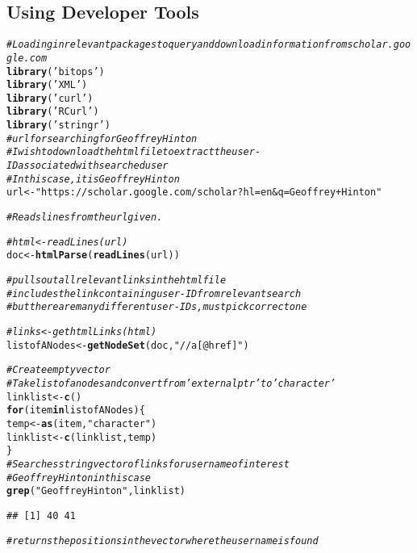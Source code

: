 \documentclass{article}\usepackage[]{graphicx}\usepackage[]{color}
\makeatletter
\newcommand{\hlstr}[1]{\textcolor[rgb]{0.192,0.494,0.8}{#1}}%
\newcommand{\hlcom}[1]{\textcolor[rgb]{0.678,0.584,0.686}{\textit{#1}}}%
\newcommand{\hlstd}[1]{\textcolor[rgb]{0.345,0.345,0.345}{#1}}%
\newcommand{\hlkwa}[1]{\textcolor[rgb]{0.161,0.373,0.58}{\textbf{#1}}}%
\newcommand{\hlkwb}[1]{\textcolor[rgb]{0.69,0.353,0.396}{#1}}%
\newcommand{\hlkwd}[1]{\textcolor[rgb]{0.737,0.353,0.396}{\textbf{#1}}}%
\newenvironment{kframe}{%
 \def\at@end@of@kframe{}%
 \ifinner\ifhmode%
  \def\at@end@of@kframe{\end{minipage}}%
  \begin{minipage}{\columnwidth}%
 \fi\fi%
 \def\FrameCommand##1{\hskip\@totalleftmargin \hskip-\fboxsep
 \colorbox{shadecolor}{##1}\hskip-\fboxsep
     \hskip-\linewidth \hskip-\@totalleftmargin \hskip\columnwidth}%
 \MakeFramed {\advance\hsize-\width
   \@totalleftmargin\z@ \linewidth\hsize
   \@setminipage}}%
 {\par\unskip\endMakeFramed%
 \at@end@of@kframe}
\newenvironment{knitrout}{}{} %
\makeatother
\begin{document}
\subsection{Using Developer Tools}
\begin{knitrout}
\color{fgcolor}\begin{kframe}
\begin{alltt}
\hlcom{#Loading in relevant packages to query and download information from scholar.google.com}
\hlkwd{library}\hlstd{(}\hlstr{'bitops'}\hlstd{)}
\hlkwd{library}\hlstd{(}\hlstr{'XML'}\hlstd{)}
\hlkwd{library}\hlstd{(}\hlstr{'curl'}\hlstd{)}
\hlkwd{library}\hlstd{(}\hlstr{'RCurl'}\hlstd{)}
\hlkwd{library}\hlstd{(}\hlstr{'stringr'}\hlstd{)}
\hlcom{#url for searching for Geoffrey Hinton}
\hlcom{#I wish to download the html file to extract the user-ID associated with searched user}
\hlcom{#In this case, it is Geoffrey Hinton}
\hlstd{url}\hlkwb{<-}\hlstr{"https://scholar.google.com/scholar?hl=en&q=Geoffrey+Hinton"}

\hlcom{#Reads lines from the url given.}

\hlcom{#html<-readLines(url)}
\hlstd{doc}\hlkwb{<-}\hlkwd{htmlParse}\hlstd{(}\hlkwd{readLines}\hlstd{(url))}
\end{alltt}


{\ttfamily\noindent\color{warningcolor}{\#\# Warning in readLines(url): incomplete final line found on 'https://scholar.google.com/scholar?hl=en\&q=Geoffrey+Hinton'}}\begin{alltt}
\hlcom{#pulls out all relevant links in the html file}
\hlcom{#includes the link containing user-ID from relevant search}
\hlcom{#but there are many different user-IDs, must pick correct one}

\hlcom{#links<-gethtmlLinks(html)}
\hlstd{listofANodes}\hlkwb{<-}\hlkwd{getNodeSet}\hlstd{(doc,} \hlstr{"//a[@href]"}\hlstd{)}

\hlcom{#Create empty vector}
\hlcom{#Take list of a nodes and convert from 'externalptr' to 'character'}
\hlstd{linklist}\hlkwb{<-}\hlkwd{c}\hlstd{()}
\hlkwa{for} \hlstd{(item} \hlkwa{in} \hlstd{listofANodes) \{}
  \hlstd{temp}\hlkwb{<-}\hlkwd{as}\hlstd{(item,} \hlstr{"character"}\hlstd{)}
  \hlstd{linklist}\hlkwb{<-}\hlkwd{c}\hlstd{(linklist, temp)}
\hlstd{\}}
\hlcom{#Searches string vector of links for user name of interest}
\hlcom{#Geoffrey Hinton in this case}
\hlkwd{grep}\hlstd{(}\hlstr{"Geoffrey Hinton"}\hlstd{, linklist)}
\end{alltt}
\begin{verbatim}
## [1] 40 41
\end{verbatim}
\begin{alltt}
\hlcom{#returns the positions in the vector where the username is found}


\end{alltt}
\end{kframe}
\end{knitrout}
\end{document}
